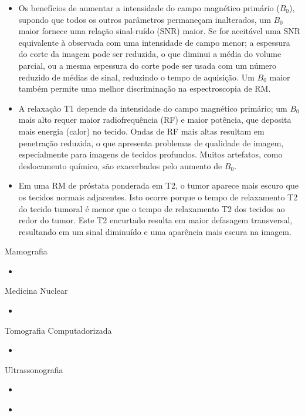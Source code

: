 \documentclass[11pt,a4paper]{article}
\newcounter{exemplo}
\begin{document}
\begin{exemplo}
\begin{itemize}
        \item Os benefícios de aumentar a intensidade do campo magnético primário ($B_0$), supondo que todos os outros parâmetros permaneçam inalterados, um $B_0$ maior fornece uma relação sinal-ruído (SNR) maior. Se for aceitável uma SNR equivalente à observada com uma intensidade de campo menor; a espessura do corte da imagem pode ser reduzida, o que diminui a média do volume parcial, ou a mesma espessura do corte pode ser usada com um número reduzido de médias de sinal, reduzindo o tempo de aquisição. Um $B_0$ maior também permite uma melhor discriminação na espectroscopia de RM.
        
        \item A relaxação T1 depende da intensidade do campo magnético primário; um $B_0$ mais alto requer maior radiofrequência (RF) e maior potência, que deposita mais energia (calor) no tecido. Ondas de RF mais altas resultam em penetração reduzida, o que apresenta problemas de qualidade de imagem, especialmente para imagens de tecidos profundos. Muitos artefatos, como deslocamento químico, são exacerbados pelo aumento de $B_0$.
                
        \item Em uma RM de próstata ponderada em T2, o tumor aparece mais escuro que os tecidos normais adjacentes. Isto ocorre porque o tempo de relaxamento T2 do tecido tumoral é menor que o tempo de relaxamento T2 dos tecidos ao redor do tumor. Este T2 encurtado resulta em maior defasagem transversal, resultando em um sinal diminuído e uma aparência mais escura na imagem. 
        
    \end{itemize}

    \textcolor{CarnationPink}{Mamografia}
    \begin{itemize}
        \item 
    
    \end{itemize}

    \textcolor{CarnationPink}{Medicina Nuclear}
    \begin{itemize}
        \item 
    
    \end{itemize}

    \textcolor{CarnationPink}{Tomografia Computadorizada}
    \begin{itemize}
        \item 
    
    \end{itemize}

    \textcolor{CarnationPink}{Ultrassonografia}
    \begin{itemize}
        \item 
    
    \end{itemize}

\end{exemplo}

\begin{exemplo}[14. IGRT]
    \begin{itemize}
        \item 
    \end{itemize}
\end{exemplo}




\end{document}
